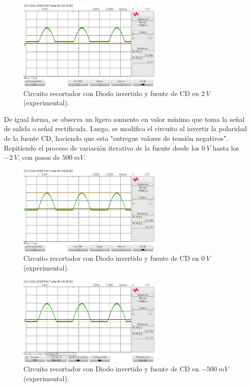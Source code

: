 \documentclass[journal]{IEEEtran}
\begin{document}
\begin{figure}[H]
        \centering
        \includegraphics[width=2.8in]{SignalExperimental_15.png}
        \caption{Circuito recortador con Diodo invertido y fuente de CD en $2~V$ (experimental).}
        \label{fig:SignalExperimental_15}
\end{figure}

De igual forma, se observa un ligero aumento en valor mínimo que toma la señal de salida o señal rectificada.
Luego, se modifica el circuito al invertir la polaridad de la fuente CD, haciendo que esta "entregue valores de tensión negativos".
Repitiendo el proceso de variación iterativo de la fuente desde los $0~V$ hasta los $-2~V$, con pasos de $500~mV$.
\begin{figure}[H]
        \centering
        \includegraphics[width=2.8in]{SignalExperimental_11.png}
        \caption{Circuito recortador con Diodo invertido y fuente de CD en $0~V$ (experimental).}
        \label{fig:SignalExperimental_16}
\end{figure}
\begin{figure}[H]
        \centering
        \includegraphics[width=2.8in]{SignalExperimental_16.png}
        \caption{Circuito recortador con Diodo invertido y fuente de CD en $-500~mV$ (experimental).}
        \label{fig:SignalExperimental_17}
\end{figure}
\end{document}
